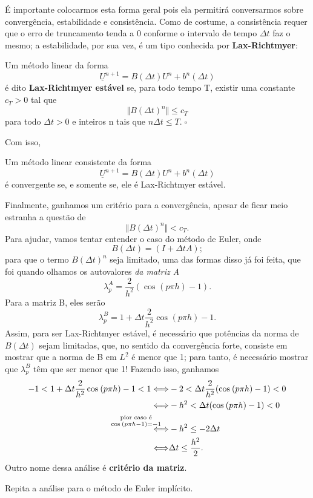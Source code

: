 \documentclass[../differential_methods.tex]{subfiles}
\begin{document}
É importante colocarmos esta forma geral pois ela permitirá conversarmos sobre convergência, estabilidade e consistência. Como de costume, a consistência requer que o erro de truncamento tenda a 0 conforme o intervalo de tempo \(\Delta t\) faz o mesmo; a estabilidade, por sua vez, é um tipo conhecida por \textbf{Lax-Richtmyer}:
\begin{def*}
	Um método linear da forma
	\[
		\underline{U}^{n+1} = B(\Delta t)U^{n} + b^{n}(\Delta t)
	\]
	é dito \textbf{Lax-Richtmyer estável} se, para todo tempo T, existir uma constante \(c_{T} > 0\) tal que
	\[
		\Vert B(\Delta t)^{n} \Vert \leq c_{T}
	\]
	para todo \(\Delta t > 0\) e inteiros n tais que \(n\Delta t \leq T.\; \square\)
\end{def*}
Com isso,
\hypertarget{lax_equivalence}{\begin{theorem*}
		Um método linear consistente da forma
		\[
			\underline{U}^{n+1} = B(\Delta t)U^{n} + b^{n}(\Delta t)
		\]
		é convergente se, e somente se, ele é Lax-Richtmyer estável.
	\end{theorem*}}

Finalmente, ganhamos um critério para a convergência, apesar de ficar meio estranha a questão de
\[
	\Vert B(\Delta t)^{n} \Vert< c_{T}.
\]
Para ajudar, vamos tentar entender o caso do método de Euler, onde
\[
	B(\Delta t) = (I+\Delta tA);
\]
para que o termo \(B(\Delta t)^{n}\) seja limitado, uma das formas disso já foi feita, que foi quando olhamos os autovalores \textit{da matriz A}
\[
	\lambda_{p}^{A}=\frac{2}{h^{2}}(\cos^{}{(p\pi h)-1}).
\]
Para a matriz B, eles serão
\[
	\lambda_{p}^{B} = 1 + \Delta t \frac{2}{h^{2}}\cos^{}{(p\pi h)-1}.
\]
Assim, para ser Lax-Richtmyer estável, é necessário que potências da norma de \(B(\Delta t)\) sejam limitadas, que, no sentido da convergência forte, consiste em mostrar que a norma de B em \(L^{2}\) é menor que 1; para tanto, é necessário mostrar que \(\lambda_{p}^{B}\) têm que ser menor que 1!
Fazendo isso, ganhamos
\begin{align*}
	-1 < 1 + \Delta t \frac{2}{h^{2}}\cos^{}{(p\pi h)-1} < 1  \Longleftrightarrow & -2 < \Delta t \frac{2}{h^{2}}(\cos^{}{(p\pi h)}-1) < 0 \\
	\Longleftrightarrow                                                           & -h^{2} < \Delta t (\cos^{}{(p\pi h)}-1) < 0            \\
	\stackrel{\mathllap{\substack{\text{pior caso é}                                                                                       \\ \cos^{}{(p\pi h-1)=-1}}}}\Longleftrightarrow &  -h^{2}\leq -2\Delta t \\
	\Longleftrightarrow                                                           & \Delta t \leq \frac{h^{2}}{2}.
\end{align*}
Outro nome dessa análise é \textbf{critério da matriz}.
\begin{exr}
	Repita a análise para o método de Euler implícito.
\end{exr}
\end{document}
